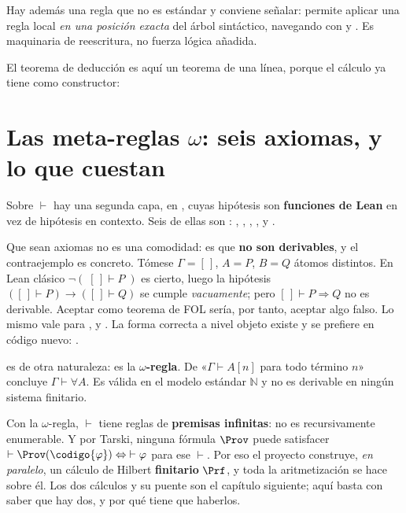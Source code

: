 Hay además una regla que no es estándar y conviene señalar:  permite aplicar una
regla local \emph{en una posición exacta} del árbol sintáctico, navegando con  y
. Es maquinaria de reescritura, no fuerza lógica añadida.

El teorema de deducción es aquí un teorema de una línea, porque el cálculo ya tiene
 como constructor:


\section{Las meta-reglas \texorpdfstring{$\omega$}{omega}: seis axiomas, y lo que cuestan}

Sobre \(\vdash\) hay una segunda capa, en , cuyas hipótesis son
\textbf{funciones de Lean} en vez de hipótesis en contexto. Seis de ellas son :
, , , ,  y .


Que sean axiomas no es una comodidad: es que \textbf{no son derivables}, y el contraejemplo es
concreto. Tómese \(\Gamma = [\,]\), \(A = P\), \(B = Q\) átomos distintos. En Lean clásico
\(\lnot(\;[\,] \vdash P\;)\) es cierto, luego la hipótesis \(([\,]\vdash P) \to ([\,]\vdash Q)\) se
cumple \emph{vacuamente}; pero \([\,] \vdash P \Rightarrow Q\) no es derivable. Aceptar
 como teorema de FOL sería, por tanto, aceptar algo falso. Lo mismo vale para
,  y . La forma correcta a nivel objeto existe y se
prefiere en código nuevo: .

 es de otra naturaleza: es la \textbf{\(\omega\)-regla}. De «\(\Gamma \vdash A[n]\) para
todo término \(n\)» concluye \(\Gamma \vdash \forall A\). Es válida en el modelo estándar
\(\mathbb{N}\) y no es derivable en ningún sistema finitario.

\begin{muro}
Con la \(\omega\)-regla, \(\vdash\) tiene reglas de \textbf{premisas infinitas}: no es recursivamente
enumerable. Y por Tarski, ninguna fórmula \(\Prov\) puede satisfacer
\(\vdash \Prov(\codigo{\varphi}) \Leftrightarrow \;\vdash \varphi\) para ese \(\vdash\).
Por eso el proyecto construye, \emph{en paralelo}, un cálculo de Hilbert \textbf{finitario}
\(\Prf\), y toda la aritmetización se hace sobre él. Los dos cálculos y su puente son el capítulo siguiente;
aquí basta con saber que hay dos, y por qué tiene que haberlos.
\end{muro}

